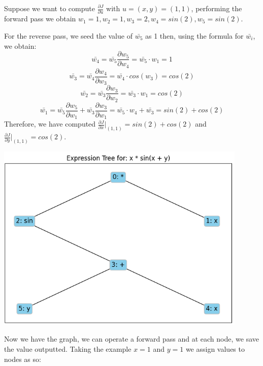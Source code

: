 \documentclass{article}
\begin{document}
Suppose we want to compute $\frac{\partial{J}}{\partial{u}}$ with $u = (x, y) = (1, 1)$, performing the forward pass we obtain $w_1 = 1, w_2 = 1, w_3 = 2, w_4 = sin(2), w_5 = sin(2)$.

For the reverse pass, we seed the value of $\bar{w_5}$ as 1 then, using the formula for $\bar{w_i}$, we obtain:
\begin{equation}
\bar{w_4} = \bar{w_5}\frac{\partial{w_5}}{\partial{w_4}} = \bar{w_5}\cdot w_1 = 1
\end{equation}
\begin{equation}
\bar{w_3} = \bar{w_4}\frac{\partial{w_4}}{\partial{w_3}} = \bar{w_4}\cdot cos(w_3) = cos(2)
\end{equation}
\begin{equation}
\bar{w_2} = \bar{w_3}\frac{\partial{w_3}}{\partial{w_2}} = \bar{w_3}\cdot w_1 = cos(2)
\end{equation}
\begin{equation}
\bar{w_1} = \bar{w_5}\frac{\partial{w_5}}{\partial{w_1}} + \bar{w_3}\frac{\partial{w_3}}{\partial{w_1}} = \bar{w_5}\cdot w_4 + \bar{w_3} = sin(2) + cos(2)
\end{equation}
Therefore, we have computed $\frac{\partial{J}}{\partial{x}}\vert_{(1, 1)} = sin(2) + cos(2)$ and $\frac{\partial{J}}{\partial{y}}\vert_{(1, 1)} = cos(2)$.



\begin{center}
    \includegraphics[width=12cm]{images/DAG_1.png}
\end{center}

Now we have the graph, we can operate a forward pass and at each node, we save the value outputted. Taking the example $x = 1$ and $y = 1$ we assign values to nodes as so:
\end{document}
